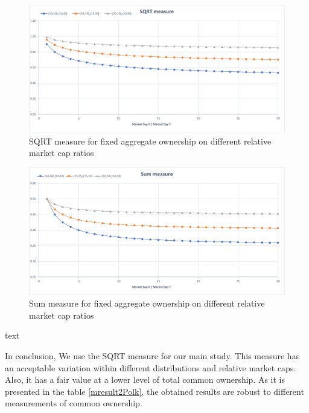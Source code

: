 \begin{appendices}
					\begin{figure}[htbp]
							\centering
							\caption{ SQRT measure for fixed aggregate ownership on different relative market cap ratios}
							\label{sqrtMarket}
							\includegraphics[width=0.85\linewidth]{Elements/3.png}
						\end{figure}
						\begin{figure}[htbp]
							\centering
							\caption{ Sum measure for fixed aggregate ownership on different relative market cap ratios}
							\label{sumMarket}
							\includegraphics[width=0.85\linewidth]{Elements/4.png}
					\end{figure}
				\begin{table}[htbp]
							\centering
							\caption{text }
							\label{marketcap}
							\resizebox{!}{!}
							{
								
							}
					\end{table}


In conclusion, We use the SQRT measure for our main study. This measure has an acceptable variation within different distributions and relative market caps. Also, it has a fair value at a lower level of total common ownership. 
	As it is presented in the table \ref{mresult2Polk}, the obtained results are robust to different measurements of common ownership.


\end{appendices}
